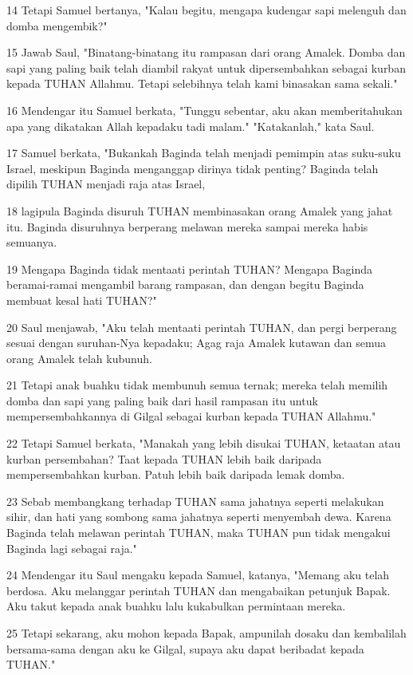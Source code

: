 \par 14 Tetapi Samuel bertanya, "Kalau begitu, mengapa kudengar sapi melenguh dan domba mengembik?"
\par 15 Jawab Saul, "Binatang-binatang itu rampasan dari orang Amalek. Domba dan sapi yang paling baik telah diambil rakyat untuk dipersembahkan sebagai kurban kepada TUHAN Allahmu. Tetapi selebihnya telah kami binasakan sama sekali."
\par 16 Mendengar itu Samuel berkata, "Tunggu sebentar, aku akan memberitahukan apa yang dikatakan Allah kepadaku tadi malam." "Katakanlah," kata Saul.
\par 17 Samuel berkata, "Bukankah Baginda telah menjadi pemimpin atas suku-suku Israel, meskipun Baginda menganggap dirinya tidak penting? Baginda telah dipilih TUHAN menjadi raja atas Israel,
\par 18 lagipula Baginda disuruh TUHAN membinasakan orang Amalek yang jahat itu. Baginda disuruhnya berperang melawan mereka sampai mereka habis semuanya.
\par 19 Mengapa Baginda tidak mentaati perintah TUHAN? Mengapa Baginda beramai-ramai mengambil barang rampasan, dan dengan begitu Baginda membuat kesal hati TUHAN?"
\par 20 Saul menjawab, "Aku telah mentaati perintah TUHAN, dan pergi berperang sesuai dengan suruhan-Nya kepadaku; Agag raja Amalek kutawan dan semua orang Amalek telah kubunuh.
\par 21 Tetapi anak buahku tidak membunuh semua ternak; mereka telah memilih domba dan sapi yang paling baik dari hasil rampasan itu untuk mempersembahkannya di Gilgal sebagai kurban kepada TUHAN Allahmu."
\par 22 Tetapi Samuel berkata, "Manakah yang lebih disukai TUHAN, ketaatan atau kurban persembahan? Taat kepada TUHAN lebih baik daripada mempersembahkan kurban. Patuh lebih baik daripada lemak domba.
\par 23 Sebab membangkang terhadap TUHAN sama jahatnya seperti melakukan sihir, dan hati yang sombong sama jahatnya seperti menyembah dewa. Karena Baginda telah melawan perintah TUHAN, maka TUHAN pun tidak mengakui Baginda lagi sebagai raja."
\par 24 Mendengar itu Saul mengaku kepada Samuel, katanya, "Memang aku telah berdosa. Aku melanggar perintah TUHAN dan mengabaikan petunjuk Bapak. Aku takut kepada anak buahku lalu kukabulkan permintaan mereka.
\par 25 Tetapi sekarang, aku mohon kepada Bapak, ampunilah dosaku dan kembalilah bersama-sama dengan aku ke Gilgal, supaya aku dapat beribadat kepada TUHAN."
